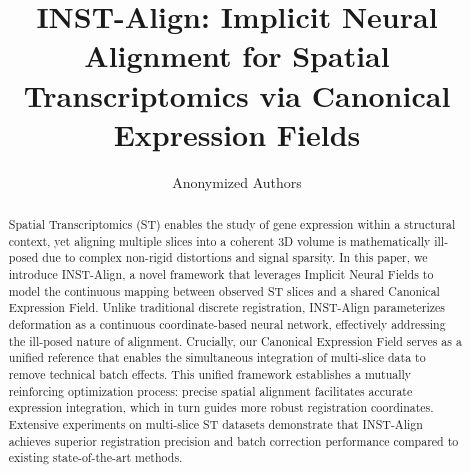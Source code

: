 \documentclass[runningheads]{llncs}
\begin{document}
%
\title{INST-Align: Implicit Neural Alignment for Spatial Transcriptomics via Canonical Expression Fields}
%

\author{Anonymized Authors}  %

\maketitle
%
\begin{abstract}
Spatial Transcriptomics (ST) enables the study of gene expression within a structural context, yet aligning multiple slices into a coherent 3D volume is mathematically ill-posed due to complex non-rigid distortions and signal sparsity. In this paper, we introduce INST-Align, a novel framework that leverages Implicit Neural Fields to model the continuous mapping between observed ST slices and a shared Canonical Expression Field. Unlike traditional discrete registration, INST-Align parameterizes deformation as a continuous coordinate-based neural network, effectively addressing the ill-posed nature of alignment. Crucially, our Canonical Expression Field serves as a unified reference that enables the simultaneous integration of multi-slice data to remove technical batch effects. This unified framework establishes a mutually reinforcing optimization process: precise spatial alignment facilitates accurate expression integration, which in turn guides more robust registration coordinates. Extensive experiments on multi-slice ST datasets demonstrate that INST-Align achieves superior registration precision and batch correction performance compared to existing state-of-the-art methods.
\end{abstract}
\end{document}
